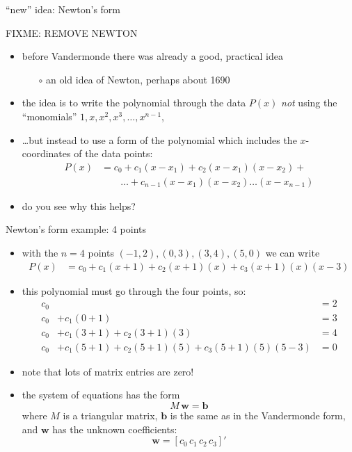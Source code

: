 \documentclass[10pt,hyperref]{beamer}
\newcommand{\bb}{\mathbf{b}}
\newcommand{\bw}{\mathbf{w}}
\begin{document}
\begin{frame}{``new'' idea: Newton's form}

FIXME: REMOVE NEWTON

\begin{itemize}
\item before Vandermonde there was already a good, practical idea
  \begin{itemize}
  \item[$\circ$] an old idea of Newton, perhaps about 1690
  \end{itemize}
\item the idea is to write the polynomial through the data $P(x)$ \emph{not} using the ``monomials'' $1,x,x^2,x^3,\dots,x^{n-1}$,
\item \dots but instead to use a form of the polynomial which includes the $x$-coordinates of the data points:
\begin{align*}
P(x) &= c_0 + c_1 (x-x_1) + c_2 (x - x_1)(x - x_2) + \\
     &\qquad \dots + c_{n-1} (x-x_1)(x-x_2) \dots (x-x_{n-1})
\end{align*}
\item do you see why this helps?

\end{itemize}
\end{frame}


\begin{frame}{Newton's form example: 4 points}

\begin{itemize}
\item with the $n=4$ points $(-1,2), (0,3), (3,4), (5,0)$ we can write
\begin{align*}
P(x) &= c_0 + c_1 (x+1) + c_2 (x +1)(x) + c_3 (x +1)(x) (x-3)
\end{align*}
\item this polynomial must go through the four points, so:
\begin{align*}
c_0 &                 &= 2 \\
c_0 &+ c_1 (0+1)                  &= 3 \\
c_0 &+ c_1 (3+1) + c_2 (3 +1)(3)  &= 4 \\
c_0 &+ c_1 (5+1) + c_2 (5 +1)(5) + c_3 (5 +1)(5) (5-3) &= 0 
\end{align*}
\item note that lots of matrix entries are zero!
\item the system of equations has the form
	$$M\, \bw = \bb$$
where $M$ is a triangular matrix, $\bb$ is the same as in the Vandermonde form, and $\bw$ has the unknown coefficients:
   $$\bw = [c_0\, c_1\, c_2\, c_3]'$$
\end{itemize}
\end{frame}
\end{document}
